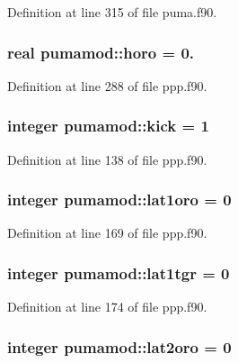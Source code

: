 \-Definition at line 315 of file puma.\-f90.

\hypertarget{classpumamod_aed84e71b62422066731030c119782c49}{
\subsubsection[{horo}]{\setlength{\rightskip}{0pt plus 5cm}real {\bf pumamod\-::horo} = 0.}}
\label{classpumamod_aed84e71b62422066731030c119782c49}


\-Definition at line 288 of file ppp.\-f90.

\hypertarget{classpumamod_a3a1c81fe64adaf2b041e815e66e59e8d}{
\subsubsection[{kick}]{\setlength{\rightskip}{0pt plus 5cm}integer {\bf pumamod\-::kick} = 1}}
\label{classpumamod_a3a1c81fe64adaf2b041e815e66e59e8d}


\-Definition at line 138 of file ppp.\-f90.

\hypertarget{classpumamod_aa7bc46dd3fcacd50e1946b36f1df9f6e}{
\subsubsection[{lat1oro}]{\setlength{\rightskip}{0pt plus 5cm}integer {\bf pumamod\-::lat1oro} = 0}}
\label{classpumamod_aa7bc46dd3fcacd50e1946b36f1df9f6e}


\-Definition at line 169 of file ppp.\-f90.

\hypertarget{classpumamod_a92dedf7e953e229c20b8bb58cb042415}{
\subsubsection[{lat1tgr}]{\setlength{\rightskip}{0pt plus 5cm}integer {\bf pumamod\-::lat1tgr} = 0}}
\label{classpumamod_a92dedf7e953e229c20b8bb58cb042415}


\-Definition at line 174 of file ppp.\-f90.

\hypertarget{classpumamod_ab0d522022938c1aea11f6c7e31ad8e65}{
\subsubsection[{lat2oro}]{\setlength{\rightskip}{0pt plus 5cm}integer {\bf pumamod\-::lat2oro} = 0}}
\label{classpumamod_ab0d522022938c1aea11f6c7e31ad8e65}


